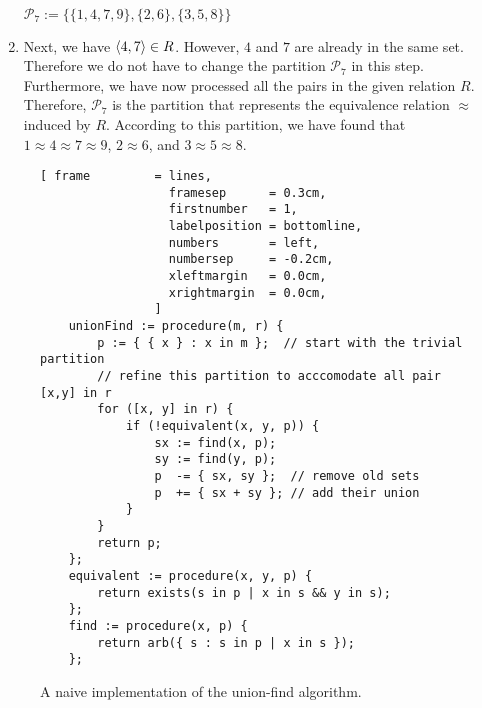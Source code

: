 \begin{enumerate}
      \\[0.2cm]
      \hspace*{1.3cm}
      $\mathcal{P}_7 := \bigl\{ \{1, 4, 7, 9\}, \{2,6\}, \{3,5,8\} \bigr\}$
\item Next, we have $\pair(4,7) \in R$.  However, $4$ and $7$ are already in the same set.
      Therefore we do not have to change the partition $\mathcal{P}_7$ in this step.
      Furthermore, we have now processed all the pairs in the given relation $R$.
      Therefore, $\mathcal{P}_7$ is the partition that represents the equivalence relation $\approx$ induced
      by $R$.  According to this partition, we have found that
      \\[0.2cm]
      \hspace*{1.3cm}
      $1 \approx 4 \approx 7 \approx 9$, \quad $2 \approx 6$,  \quad and \quad $3 \approx 5 \approx 8$.
\end{enumerate}
 

\begin{figure}[!ht]
\centering
\begin{Verbatim}[ frame         = lines, 
                  framesep      = 0.3cm, 
                  firstnumber   = 1,
                  labelposition = bottomline,
                  numbers       = left,
                  numbersep     = -0.2cm,
                  xleftmargin   = 0.0cm,
                  xrightmargin  = 0.0cm,
                ]
    unionFind := procedure(m, r) {
        p := { { x } : x in m };  // start with the trivial partition
        // refine this partition to acccomodate all pair [x,y] in r
        for ([x, y] in r) {
            if (!equivalent(x, y, p)) {
                sx := find(x, p);
                sy := find(y, p);
                p  -= { sx, sy };  // remove old sets
                p  += { sx + sy }; // add their union
            }
        }
        return p;
    };
    equivalent := procedure(x, y, p) {
        return exists(s in p | x in s && y in s);
    };
    find := procedure(x, p) {
        return arb({ s : s in p | x in s });  
    };
\end{Verbatim}
\vspace*{-0.3cm}
\caption{A naive implementation of the union-find algorithm.}
\label{fig:union-find-naive.stlx}
\end{figure}

